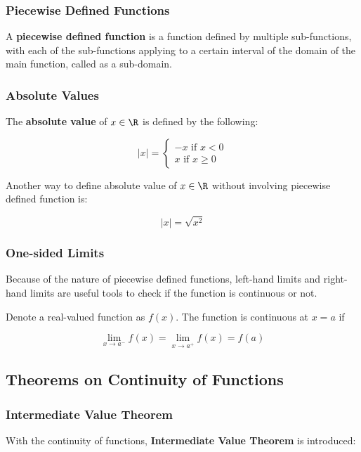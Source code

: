 \subsubsection{Piecewise Defined Functions}
\begin{dft}
  A \textbf{piecewise defined function} is a function defined by multiple sub-functions, with each of the sub-functions applying to a certain interval of the domain of the main function, called as a sub-domain.
\end{dft}

\subsubsection{Absolute Values}
\begin{dft}
  The \textbf{absolute value} of $x\in \R$ is defined by the following:

  $$\left| x\right| =\left\{ \begin{matrix}
    -x\text{ if }x<0\\
    x\text{ if }x\geq 0
  \end{matrix}\right.$$

  Another way to define absolute value of $x\in \R$ without involving piecewise defined function is:

  $$\left| x\right| =\sqrt{x^{2}}$$
\end{dft}

\subsubsection{One-sided Limits}
Because of the nature of piecewise defined functions, left-hand limits and right-hand limits are useful tools to check if the function is continuous or not.\n

\begin{thm}
  Denote a real-valued function as $f(x)$. The function is continuous at $x=a$ if

  $$\lim_{x\to a^{-}}f(x)=\lim_{x\to a^{+}}f(x)=f(a)$$
\end{thm}

\subsection{Theorems on Continuity of Functions}
\subsubsection{Intermediate Value Theorem}
With the continuity of functions, \textbf{Intermediate Value Theorem} is introduced:\n

